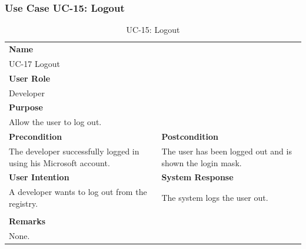 \subsubsection{Use Case UC-15: Logout}\label{subsubsec:use-case-uc-15:-logout}

\begin{table}[H]
    \centering
    \begin{tabular}{|p{}|p{}|}

        \hline
        \multicolumn{2}{|l|}{\rowcolor{gray!50}\textbf{Name}} \\
        \multicolumn{2}{|l|}{UC-17 Logout} \\ \hline

        \multicolumn{2}{|l|}{\rowcolor{gray!50}\textbf{User Role}} \\
        \multicolumn{2}{|l|}{Developer} \\ \hline

        \multicolumn{2}{|l|}{\rowcolor{gray!50}\textbf{Purpose}} \\
        \multicolumn{2}{|l|}{Allow the user to log out.} \\ \hline

        \rowcolor{gray!50}\textbf{Precondition} & \rowcolor{gray!50}\textbf{Postcondition} \\
        The developer successfully logged in using his Microsoft account.
        &
        The user has been logged out and is shown the login mask.  \\ \hline

        \rowcolor{gray!50}\textbf{User Intention} & \rowcolor{gray!50}\textbf{System Response} \\
        A developer wants to log out from the registry.
        &
        The system logs the user out. \\ \hline

        & \\ \hline

        \multicolumn{2}{|l|}{\rowcolor{gray!50}\textbf{Remarks}} \\
        \multicolumn{2}{|p{1\textwidth}|}{None.} \\ \hline
    \end{tabular}
    \caption{UC-15: Logout}
    \label{tab:uc-logout}
\end{table}
